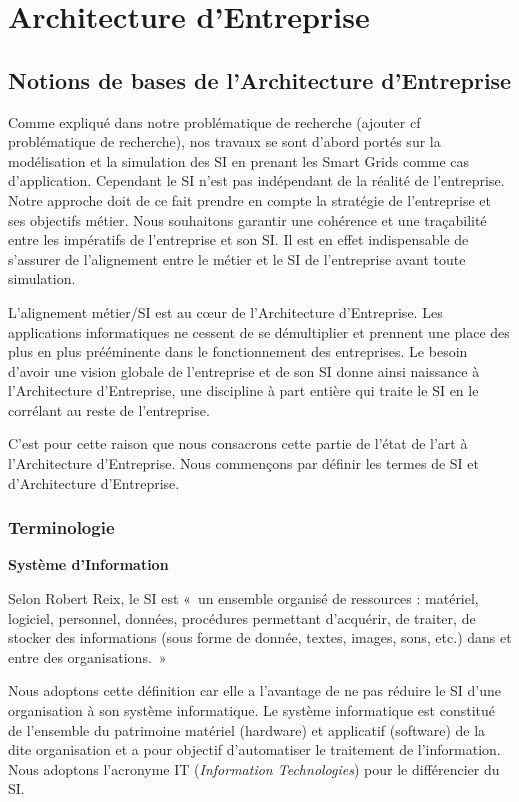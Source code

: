 \chapter{Architecture d'Entreprise}
\label{chap:EA}

\section{Notions de bases de l'Architecture d'Entreprise}

Comme expliqué dans notre problématique de recherche (ajouter cf problématique de recherche),   nos travaux se sont d'abord portés sur la modélisation et la simulation des SI en prenant les Smart Grids comme cas d'application. Cependant le SI n'est pas indépendant de la réalité de l'entreprise. Notre approche doit de ce fait prendre en compte la stratégie de l'entreprise et ses objectifs métier. Nous souhaitons garantir une cohérence et une traçabilité entre les impératifs de l'entreprise et son SI. Il est en effet indispensable de s'assurer de l'alignement entre le métier et le SI de l'entreprise avant toute simulation. 

L'alignement métier/SI est au cœur de l'Architecture d'Entreprise. Les applications informatiques ne cessent de se démultiplier et prennent une place des plus en plus prééminente dans le fonctionnement des entreprises. Le besoin d'avoir une vision globale de l'entreprise et de son SI donne ainsi naissance à l'Architecture d'Entreprise, une discipline à part entière qui traite le SI en le corrélant au reste de l'entreprise. 

C'est pour cette raison que nous consacrons cette partie de l'état de l'art à l'Architecture d'Entreprise. Nous commençons par définir les termes de SI et d'Architecture d'Entreprise. 
  
\subsection{Terminologie}

\textbf{Système d'Information}

Selon Robert Reix, le SI est «~un ensemble organisé de ressources : matériel, 
logiciel, personnel, données, procédures permettant d'acquérir, de traiter, de 
stocker des informations (sous forme de donnée, textes, images, sons, etc.) dans 
et entre des organisations.~»

Nous adoptons cette définition car elle a l'avantage de ne pas réduire le SI 
d'une organisation à son système informatique. Le système informatique est constitué de 
l'ensemble du patrimoine matériel (hardware) et applicatif (software) de la dite 
organisation et a pour objectif d'automatiser le traitement de l'information. 
Nous adoptons l'acronyme IT (\textit{Information Technologies}) pour le 
différencier du SI.

